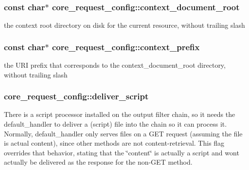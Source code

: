 \subsubsection[{\texorpdfstring{context\+\_\+document\+\_\+root}{context_document_root}}]{\setlength{\rightskip}{0pt plus 5cm}const char$\ast$ core\+\_\+request\+\_\+config\+::context\+\_\+document\+\_\+root}\hypertarget{structcore__request__config_a8d2ba80a88efece097a10d9f540dc5c8}{}\label{structcore__request__config_a8d2ba80a88efece097a10d9f540dc5c8}
the context root directory on disk for the current resource, without trailing slash 
\subsubsection[{\texorpdfstring{context\+\_\+prefix}{context_prefix}}]{\setlength{\rightskip}{0pt plus 5cm}const char$\ast$ core\+\_\+request\+\_\+config\+::context\+\_\+prefix}\hypertarget{structcore__request__config_af42a8ded82353bbb370c476bb3b7404c}{}\label{structcore__request__config_af42a8ded82353bbb370c476bb3b7404c}
the U\+RI prefix that corresponds to the context\+\_\+document\+\_\+root directory, without trailing slash 
\subsubsection[{\texorpdfstring{deliver\+\_\+script}{deliver_script}}]{ core\+\_\+request\+\_\+config\+::deliver\+\_\+script}\hypertarget{structcore__request__config_a47a1ab28ea383932931c5782a4780fd1}{}\label{structcore__request__config_a47a1ab28ea383932931c5782a4780fd1}
There is a script processor installed on the output filter chain, so it needs the default\+\_\+handler to deliver a (script) file into the chain so it can process it. Normally, default\+\_\+handler only serves files on a G\+ET request (assuming the file is actual content), since other methods are not content-\/retrieval. This flag overrides that behavior, stating that the \char`\"{}content\char`\"{} is actually a script and won\textquotesingle{}t actually be delivered as the response for the non-\/\+G\+ET method. 
